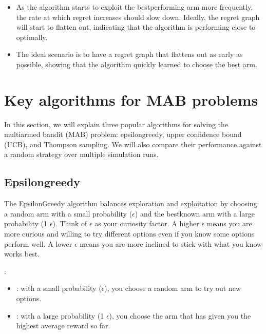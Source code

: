 \documentclass[letterpaper,10pt,english]{jupyterBook}
\begin{document}
\begin{enumerate}
\begin{itemize}
\item {} 
\sphinxAtStartPar
As the algorithm starts to exploit the best\sphinxhyphen{}performing arm more frequently, the rate at which regret increases should slow down. Ideally, the regret graph will start to flatten out, indicating that the algorithm is performing close to optimally.

\item {} 
\sphinxAtStartPar
The ideal scenario is to have a regret graph that flattens out as early as possible, showing that the algorithm quickly learned to choose the best arm.

\end{itemize}

\end{enumerate}


\section{Key algorithms for MAB problems}
\label{\detokenize{notebooks/bandits:key-algorithms-for-mab-problems}}
\sphinxAtStartPar
In this section, we will explain three popular algorithms for solving the multi\sphinxhyphen{}armed bandit (MAB) problem: epsilon\sphinxhyphen{}greedy, upper confidence bound (UCB), and Thompson sampling. We will also compare their performance against a random strategy over multiple simulation runs.


\subsection{Epsilon\sphinxhyphen{}greedy}
\label{\detokenize{notebooks/bandits:epsilon-greedy}}
\sphinxAtStartPar
The Epsilon\sphinxhyphen{}Greedy algorithm balances exploration and exploitation by choosing a random arm with a small probability (\(\epsilon\)) and the best\sphinxhyphen{}known arm with a large probability (1 \sphinxhyphen{} \(\epsilon\)). Think of \(\epsilon\) as your curiosity factor. A higher \(\epsilon\) means you are more curious and willing to try different options even if you know some options perform well. A lower \(\epsilon\) means you are more inclined to stick with what you know works best.

\sphinxAtStartPar
{}:
\begin{itemize}
\item {} 
\sphinxAtStartPar
{}: with a small probability (\(\epsilon\)), you choose a random arm to try out new options.

\item {} 
\sphinxAtStartPar
{}: with a large probability (1 \sphinxhyphen{} \(\epsilon\)), you choose the arm that has given you the highest average reward so far.

\end{itemize}
\end{document}
